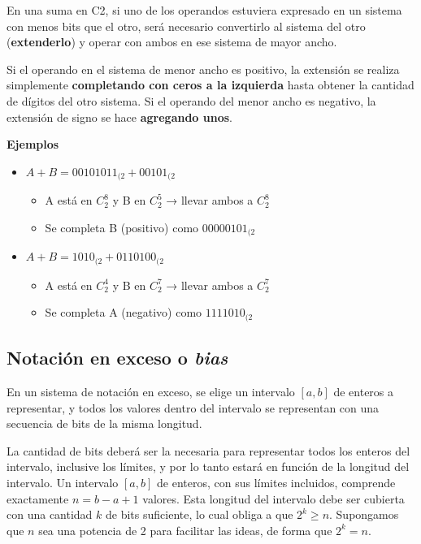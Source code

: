 \documentclass[spanish,A4,]{article}
\begin{document}
En una suma en C2, si uno de los operandos estuviera expresado en un
sistema con menos bits que el otro, será necesario convertirlo al
sistema del otro (\textbf{extenderlo}) y operar con ambos en ese sistema
de mayor ancho.

Si el operando en el sistema de menor ancho es positivo, la extensión se
realiza simplemente \textbf{completando con ceros a la izquierda} hasta
obtener la cantidad de dígitos del otro sistema. Si el operando del
menor ancho es negativo, la extensión de signo se hace \textbf{agregando
unos}.

\textbf{Ejemplos}

\begin{itemize}
\itemsep1pt\parskip0pt
\item
  $A + B = 00101011_{(2} + 00101_{(2}$

  \begin{itemize}
  \itemsep1pt\parskip0pt
  \item
    A está en $C^8_2$ y B en $C^5_2$ → llevar ambos a $C^8_2$
  \item
    Se completa B (positivo) como $00000101_{(2}$
  \end{itemize}
\item
  $A + B = 1010_{(2} + 0110100_{(2}$

  \begin{itemize}
  \itemsep1pt\parskip0pt
  \item
    A está en $C^4_2$ y B en $C^7_2$ → llevar ambos a $C^7_2$
  \item
    Se completa A (negativo) como $1111010_{(2}$
  \end{itemize}
\end{itemize}

\subsection{Notación en exceso o
\emph{bias}}\label{notaciuxf3n-en-exceso-o-bias}

En un sistema de notación en exceso, se elige un intervalo $[a, b]$ de
enteros a representar, y todos los valores dentro del intervalo se
representan con una secuencia de bits de la misma longitud.

La cantidad de bits deberá ser la necesaria para representar todos los
enteros del intervalo, inclusive los límites, y por lo tanto estará en
función de la longitud del intervalo. Un intervalo $[a, b]$ de enteros,
con sus límites incluidos, comprende exactamente $n = b - a + 1$
valores. Esta longitud del intervalo debe ser cubierta con una cantidad
$k$ de bits suficiente, lo cual obliga a que $2^k \geq n$. Supongamos
que $n$ sea una potencia de 2 para facilitar las ideas, de forma que
$2^k = n$.
\end{document}

